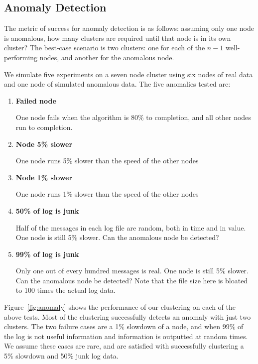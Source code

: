 \documentclass[conference]{style/acmsiggraph}
\begin{document}
\subsection{Anomaly Detection}
\label{subsec:results:anomaly}
The metric of success for anomaly detection is as follows: assuming only one node is anomalous, how many clusters are required until that node is in its own cluster?
The best-case scenario is two clusters: one for each of the $n-1$ well-performing nodes, and another for the anomalous node.

We simulate five experiments on a seven node cluster using six nodes of real data and one node of simulated anomalous data.
The five anomalies tested are:
\begin{enumerate}
\item
\textbf{Failed node}

One node fails when the algorithm is 80\% to completion, and all other nodes run to completion.
\item
\textbf{Node 5\% slower}

One node runs 5\% slower than the speed of the other nodes
\item
\textbf{Node 1\% slower}

One node runs 1\% slower than the speed of the other nodes
\item
\textbf{50\% of log is junk}

Half of the messages in each log file are random, both in time and in value. One node is still 5\% slower. Can the anomalous node be detected?
\item
\textbf{99\% of log is junk}

Only one out of every hundred messages is real. One node is still 5\% slower. Can the anomalous node be detected? Note that the file size here is bloated to 100 times the actual log data.
\end{enumerate}

Figure~\ref{fig:anomaly} shows the performance of our clustering on each of the above tests.
Most of the clustering successfully detects an anomaly with just two clusters.
The two failure cases are a 1\% slowdown of a node, and when 99\% of the log is not useful information and information is outputted at random times.
We assume these cases are rare, and are satisfied with successfully clustering a 5\% slowdown and 50\% junk log data.
\end{document}
